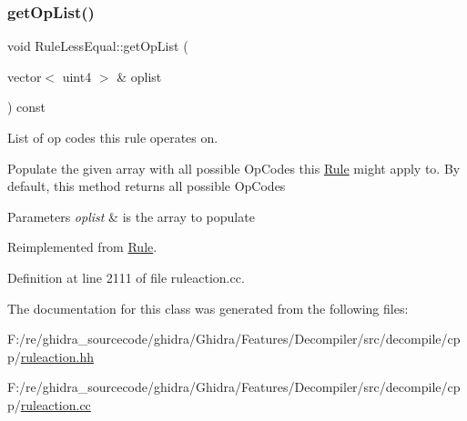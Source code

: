 \subsubsection{\texorpdfstring{getOpList()}{getOpList()}}
{\footnotesize\ttfamily void Rule\+Less\+Equal\+::get\+Op\+List (\begin{DoxyParamCaption}\item[{vector$<$ uint4 $>$ \&}]{oplist }\end{DoxyParamCaption}) const\hspace{0.3cm}{\ttfamily [virtual]}}



List of op codes this rule operates on. 

Populate the given array with all possible Op\+Codes this \mbox{\hyperlink{class_rule}{Rule}} might apply to. By default, this method returns all possible Op\+Codes 
\begin{DoxyParams}{Parameters}
{\em oplist} & is the array to populate \\
\hline
\end{DoxyParams}


Reimplemented from \mbox{\hyperlink{class_rule_a4023bfc7825de0ab866790551856d10e}{Rule}}.



Definition at line 2111 of file ruleaction.\+cc.



The documentation for this class was generated from the following files\+:\begin{DoxyCompactItemize}
\item 
F\+:/re/ghidra\+\_\+sourcecode/ghidra/\+Ghidra/\+Features/\+Decompiler/src/decompile/cpp/\mbox{\hyperlink{ruleaction_8hh}{ruleaction.\+hh}}\item 
F\+:/re/ghidra\+\_\+sourcecode/ghidra/\+Ghidra/\+Features/\+Decompiler/src/decompile/cpp/\mbox{\hyperlink{ruleaction_8cc}{ruleaction.\+cc}}\end{DoxyCompactItemize}
